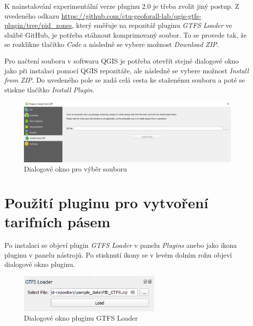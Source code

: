 K nainstalování experimentální verze pluginu 2.0 je třeba zvolit jiný postup.
Z uvedeného odkazu \href{https://github.com/ctu-geoforall-lab/qgis-gtfs-plugin/tree/pid\_zones}
{https://github.com/ctu-geoforall-lab/qgis-gtfs-plugin/tree/pid\_zo\-nes}, který směřuje na repozitář
pluginu \textit{GTFS Loader} ve službě GitHub, je potřeba stáhnout komprimovaný  soubor. 
To se provede tak, že se rozklikne tlačítko \textit{Code} a následně se vybere možnost
\textit{Download ZIP}.  

Pro načtení  souboru v softwaru QGIS je potřeba otevřít stejné dialogové okno
jako při instalaci pomocí QGIS repozitáře, ale následně se vybere možnost \textit{Install from ZIP}. 
Do uvedeného pole se zadá celá cesta ke staženému  souboru a poté se stiskne tlačítko
\textit{Install Plugin}.

\begin{figure}[H] \centering
    \includegraphics[width=400pt]{./pictures-dodatek/zip.png}
    \caption[Dialogové okno pro výběr  souboru]{Dialogové okno pro výběr  souboru}
	\label{fig:zip}              
\end{figure} 

\section{Použití pluginu pro vytvoření tarifních pásem}

Po instalaci se objeví plugin \textit{GTFS Loader} v panelu \textit{Plugins} anebo jako ikona pluginu
v panelu nástrojů. Po stisknutí ikony se v levém dolním rohu objeví dialogové okno pluginu.

\begin{figure}[H] \centering
    \includegraphics[width=200pt]{./pictures-dodatek/plugin.png}
    \caption[Dialogové okno pluginu GTFS Loader]{Dialogové okno pluginu GTFS Loader}
	\label{fig:gtfs_loader}              
\end{figure} 

